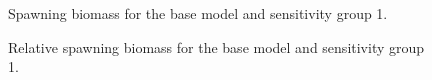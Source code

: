 \documentclass[11pt]{book}
\begin{document}
\begin{figure}[H]

{\centering {} 

}

\caption{Spawning biomass for the base model and sensitivity group 1.}\label{fig:fig-sens-variance}
\end{figure}



\begin{figure}[H]

{\centering {} 

}

\caption{Relative spawning biomass for the base model and sensitivity group 1.}\label{fig:fig-sens-variance-rel}
\end{figure}
\end{document}
